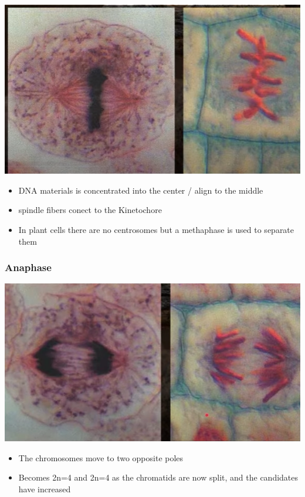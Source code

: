 \documentclass{article}
\begin{document}
\includegraphics*[scale=0.5]{metaphase.png}


\begin{itemize}
    \item DNA materials is concentrated into the center / align to the middle
    \item spindle fibers conect to the Kinetochore
    \item In plant cells there are no centrosomes but a methaphase is used to separate them
\end{itemize}
\subsubsection*{Anaphase}


\includegraphics*[scale=0.5]{anaphase.png}


\begin{itemize}
    \item The chromosomes move to two opposite poles
    \item Becomes 2n=4 and 2n=4 as the chromatids are now split, and the candidates have increased
\end{itemize}
\end{document}
